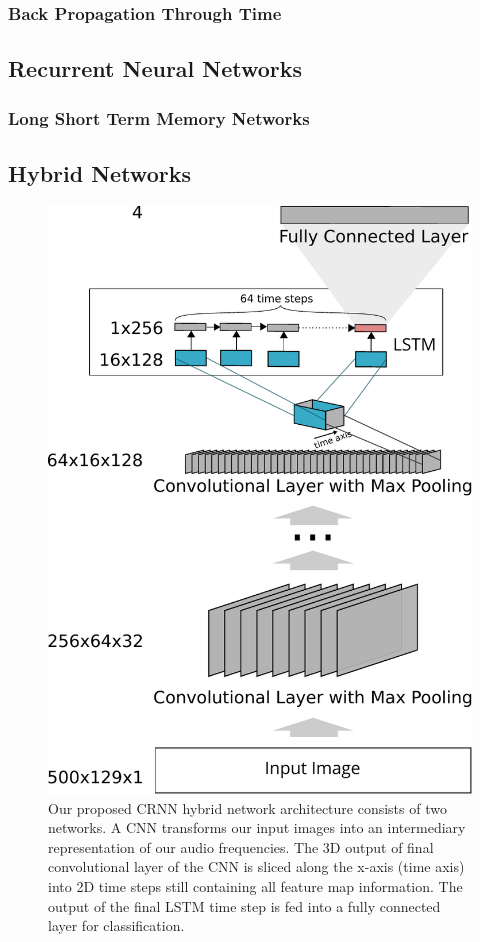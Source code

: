 \subsubsection{Back Propagation Through Time}

\subsection{Recurrent Neural Networks}
\subsubsection{Long Short Term Memory Networks}

\subsection{Hybrid Networks}
\label{sec:hybrid_networks}

	\begin{figure}[]
  		\centering
    	\includegraphics[width=\textwidth, keepaspectratio]{img/crnn.pdf}
    	\caption{Our proposed CRNN hybrid network architecture consists of two networks. A CNN transforms our input images into an intermediary representation of our audio frequencies. The 3D output of final convolutional layer of the CNN is sliced along the x-axis (time axis) into 2D time steps still containing all feature map information. The output of the final LSTM time step is fed into a fully connected layer for classification.}
    	\label{fig:crnn}
	\end{figure}
	

